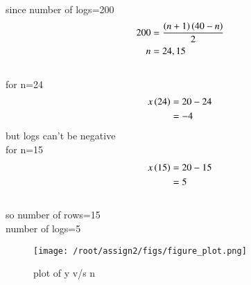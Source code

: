 \documentclass[journal,12pt,twocolumn]{IEEEtran}
\theoremstyle{remark}
\begin{document}
since number of logs=200
\begin{align}
 200&=\frac{\left(n+1\right)\left(40-n\right)}{2}   
\\n&=24,15
\end{align}
\\for n=24
\begin{align}
x\left(24\right)&=20-24
\\&={-4}
\end{align}
but logs can't be negative
\\for n=15
\begin{align}
x\left(15\right)&=20-15
\\&=5
\end{align}
\\so number of rows=15
\\number of logs=5
\\\begin{figure}[h]
  \renewcommand\thefigure{1}
    \centering
    \texttt{[image: /root/assign2/figs/figure\_plot.png]}
    \caption{plot of y v/s n}
    \label{fig:enter-label}
\end{figure}
\end{document}

